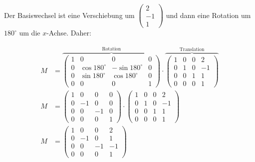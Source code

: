 \documentclass[a4paper]{scrartcl}
\begin{document}

Der Basiswechsel ist eine Verschiebung um $\begin{pmatrix}2\\-1\\1\end{pmatrix}$
und dann eine Rotation um $180^\circ$ um die $x$-Achse. Daher:

\begin{align}
    M &= \overbrace{\begin{pmatrix}1 & 0 & 0 & 0\\
                        0 & \cos 180^\circ & -\sin 180^\circ & 0\\
                        0 & \sin 180^\circ & \cos 180^\circ  & 0\\
                        0 &              0 &              0  & 1\end{pmatrix}}^{\text{Rotation}}
         \cdot
         \overbrace{
         \begin{pmatrix}1 & 0 & 0 & 2\\
                        0 & 1 & 0 & -1\\
                        0 & 0 & 1 & 1\\
                        0 & 0 & 0 & 1\end{pmatrix}}^{\text{Translation}}\\
    M &= \begin{pmatrix}1 &  0 &  0 & 0\\
                        0 & -1 &  0 & 0\\
                        0 &  0 & -1 & 0\\
                        0 &  0 &  0 & 1\end{pmatrix}
         \cdot
         \begin{pmatrix}1 & 0 & 0 & 2\\
                        0 & 1 & 0 & -1\\
                        0 & 0 & 1 & 1\\
                        0 & 0 & 0 & 1\end{pmatrix}\\
    M &= \begin{pmatrix}1 &  0 &  0 & 2\\
                        0 & -1 &  0 & 1\\
                        0 &  0 & -1 & -1\\
                        0 &  0 &  0 & 1\end{pmatrix}
\end{align}
\end{document}
